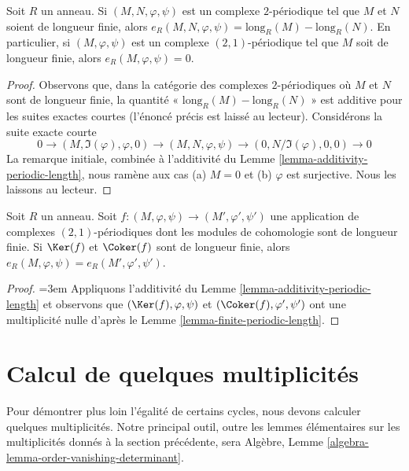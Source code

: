 \begin{lemma}
\label{lemma-finite-periodic-length}
Soit $R$ un anneau. Si $(M, N, \varphi, \psi)$ est un complexe $2$-périodique
tel que $M$ et $N$ soient de longueur finie, alors
$e_R(M, N, \varphi, \psi) = \text{long}_R(M) - \text{long}_R(N)$.
En particulier, si $(M, \varphi, \psi)$ est un complexe $(2, 1)$-périodique
tel que $M$ soit de longueur finie, alors
$e_R(M, \varphi, \psi) = 0$.
\end{lemma}

\begin{proof}
Observons que, dans la catégorie des complexes $2$-périodiques où $M$ et $N$
sont de longueur finie, la quantité « $\text{long}_R(M) - \text{long}_R(N)$ »
est additive pour les suites exactes courtes (l'énoncé précis est laissé au lecteur).
Considérons la suite exacte courte
$$
0 \to (M, \Im(\varphi), \varphi, 0) \to
(M, N, \varphi, \psi) \to (0, N/\Im(\varphi), 0, 0) \to 0
$$
La remarque initiale, combinée à l'additivité du
Lemme \ref{lemma-additivity-periodic-length},
nous ramène aux cas (a) $M = 0$ et (b) $\varphi$ est surjective.
Nous les laissons au lecteur.
\end{proof}

\begin{lemma}
\label{lemma-compare-periodic-lengths}
Soit $R$ un anneau. Soit $f : (M, \varphi, \psi) \to (M', \varphi', \psi')$
une application de complexes $(2, 1)$-périodiques dont les modules de cohomologie
sont de longueur finie. Si $\Ker(f)$ et $\Coker(f)$ sont de longueur finie,
alors $e_R(M, \varphi, \psi) = e_R(M', \varphi', \psi')$.
\end{lemma}

\begin{proof}
{\emergencystretch=3em Appliquons l'additivité du Lemme \ref{lemma-additivity-periodic-length}
et observons que $(\Ker(f), \varphi, \psi)$ et
$(\Coker(f), \varphi', \psi')$ ont une multiplicité nulle d'après le
Lemme \ref{lemma-finite-periodic-length}.\par}
\end{proof}




\section{Calcul de quelques multiplicités}
\label{section-calculation}

\noindent
Pour démontrer plus loin l'égalité de certains cycles, nous devons
calculer quelques multiplicités. Notre principal outil, outre les
lemmes élémentaires sur les multiplicités donnés à la section précédente,
sera Algèbre, Lemme \ref{algebra-lemma-order-vanishing-determinant}.

